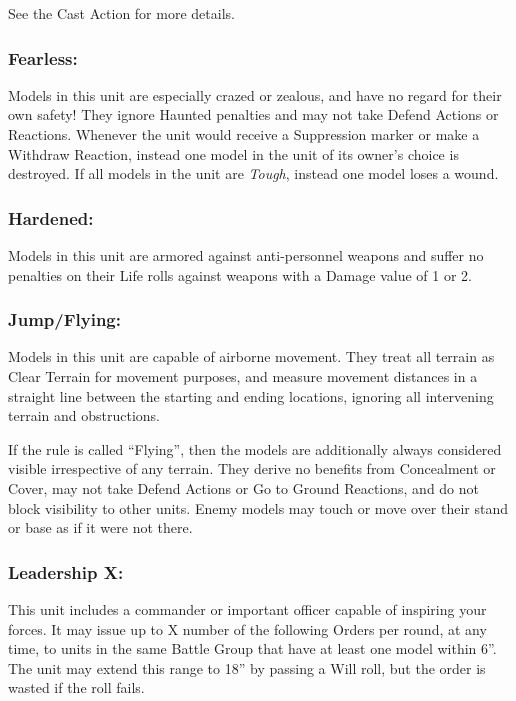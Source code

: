 \begin{multicols}{2}
See the Cast Action for more details.

\subsubsection*{Fearless:} Models in this unit are especially crazed or zealous, and have no regard for their own safety! They ignore Haunted penalties and may not take Defend Actions or Reactions. Whenever the unit would receive a Suppression marker or make a Withdraw Reaction, instead one model in the unit of its owner's choice is destroyed. If all models in the unit are \textit{Tough}, instead one model loses a wound.

\subsubsection*{Hardened:} Models in this unit are armored against anti-personnel weapons and suffer no penalties on their Life rolls against weapons with a Damage value of 1 or 2.

\subsubsection*{Jump/Flying:} Models in this unit are capable of airborne movement. They treat all terrain as Clear Terrain for movement purposes, and measure movement distances in a straight line between the starting and ending locations, ignoring all intervening terrain and obstructions.

If the rule is called ``Flying'', then the models are additionally always considered visible irrespective of any terrain. They derive no benefits from Concealment or Cover, may not take Defend Actions or Go to Ground Reactions, and do not block visibility to other units. Enemy models may touch or move over their stand or base as if it were not there.

\subsubsection*{Leadership X:} This unit includes a commander or important officer capable of inspiring your forces. It may issue up to X number of the following Orders per round, at any time, to units in the same Battle Group that have at least one model within 6''. The unit may extend this range to 18'' by passing a Will roll, but the order is wasted if the roll fails.


\end{multicols}
